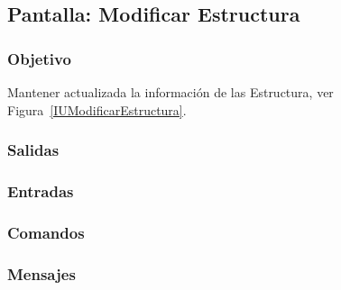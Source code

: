 \subsection{Pantalla: Modificar Estructura}

\subsubsection{Objetivo}
	Mantener actualizada la información de las Estructura, ver Figura~\ref{IUModificarEstructura}.


\subsubsection{Salidas}


\subsubsection{Entradas}


\subsubsection{Comandos}


\subsubsection{Mensajes}
